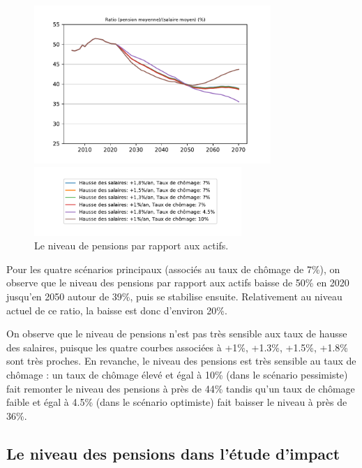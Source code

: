 \documentclass[10pt]{article}
\begin{document}
\begin{figure}
\begin{center}
\includegraphics[width=0.8\textwidth]{Simulation-P.pdf}

\includegraphics[width=0.7\textwidth]{Simulation-legende.pdf}
\end{center}

\caption{Le niveau de pensions par rapport aux actifs.}
\label{fig-simulation-P}
\end{figure}

Pour les quatre scénarios principaux (associés au taux de chômage 
de 7\%), on observe que le niveau des pensions par rapport aux actifs 
baisse de 50\% en 2020 jusqu'en 2050 autour de 39\%, puis se stabilise ensuite. 
Relativement au niveau actuel de ce ratio, la baisse est donc d'environ 20\%. 

On observe que le niveau de pensions n'est pas très sensible 
aux taux de hausse des salaires, puisque les quatre courbes associées 
à +1\%, +1.3\%, +1.5\%,  +1.8\% sont très proches. 
En revanche, le niveau des pensions est très sensible au taux de chômage : 
un taux de chômage élevé et égal à 10\% (dans le scénario pessimiste) 
fait remonter le niveau des pensions à près de 44\% tandis qu'un taux de 
chômage faible et égal à 4.5\% (dans le scénario optimiste) fait baisser 
le niveau à près de 36\%. 


\subsection{Le niveau des pensions dans l'étude d'impact}
\end{document}
